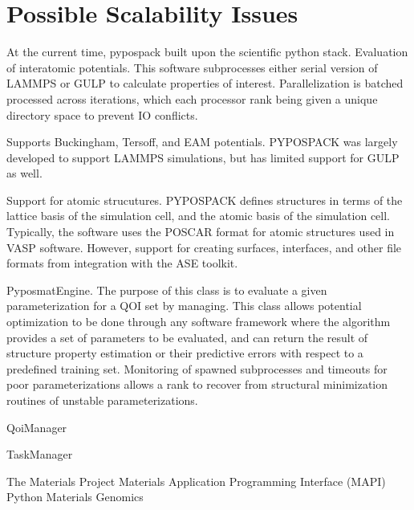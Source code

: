 \section{Possible Scalability Issues}

At the current time, pypospack built upon the scientific python stack.
Evaluation of interatomic potentials.  This software subprocesses either serial version of LAMMPS or GULP to calculate properties of interest.  Parallelization is batched processed across iterations, which each processor rank being given a unique directory space to prevent IO conflicts.

Supports Buckingham, Tersoff, and EAM potentials.  PYPOSPACK was largely developed to support LAMMPS simulations, but has limited support for GULP as well.

Support for atomic strucutures.  PYPOSPACK defines structures in terms of the lattice basis of the simulation cell, and the atomic basis of the simulation cell.  Typically, the software uses the POSCAR format for atomic structures used in VASP software.  However, support for creating surfaces, interfaces, and other file formats from integration with the ASE toolkit.

PyposmatEngine.  The purpose of this class is to evaluate a given parameterization for a QOI set by managing.  This class allows potential optimization to be done through any software framework where the algorithm provides a set of parameters to be evaluated, and can return the result of structure property estimation or their predictive errors with respect to a predefined training set.  Monitoring of spawned subprocesses and timeouts for poor parameterizations allows a rank to recover from structural minimization routines of unstable parameterizations.

QoiManager

TaskManager


The Materials Project\cite{Jain2013_materialsproject}
Materials Application Programming Interface (MAPI) \cite{ong2015_mapi}
Python Materials Genomics\cite{ong2013_pymatgen}
